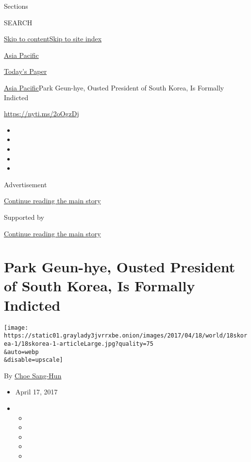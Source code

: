 Sections

SEARCH

\protect\hyperlink{site-content}{Skip to
content}\protect\hyperlink{site-index}{Skip to site index}

\href{https://www.nytimes3xbfgragh.onion/section/world/asia}{Asia
Pacific}

\href{https://myaccount.nytimes3xbfgragh.onion/auth/login?response_type=cookie\&client_id=vi}{}

\href{https://www.nytimes3xbfgragh.onion/section/todayspaper}{Today's
Paper}

\href{/section/world/asia}{Asia Pacific}\textbar{}Park Geun-hye, Ousted
President of South Korea, Is Formally Indicted

\url{https://nyti.ms/2oOgzDj}

\begin{itemize}
\item
\item
\item
\item
\item
\end{itemize}

Advertisement

\protect\hyperlink{after-top}{Continue reading the main story}

Supported by

\protect\hyperlink{after-sponsor}{Continue reading the main story}

\hypertarget{park-geun-hye-ousted-president-of-south-korea-is-formally-indicted}{%
\section{Park Geun-hye, Ousted President of South Korea, Is Formally
Indicted}\label{park-geun-hye-ousted-president-of-south-korea-is-formally-indicted}}

\texttt{[image: https://static01.graylady3jvrrxbe.onion/images/2017/04/18/world/18skorea-1/18skorea-1-articleLarge.jpg?quality=75\\\&auto=webp\\\&disable=upscale]}

By \href{http://www.nytimes3xbfgragh.onion/by/choe-sang-hun}{Choe
Sang-Hun}

\begin{itemize}
\item
  April 17, 2017
\item
  \begin{itemize}
  \item
  \item
  \item
  \item
  \item
  \end{itemize}
\end{itemize}

